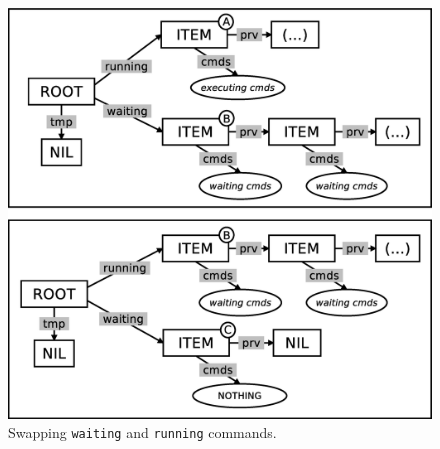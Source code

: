 \documentclass{sig-alternate}
\newcommand{\code}[1] {{\small{\texttt{#1}}}}
\begin{document}
\begin{figure}[t]
\centering
\includegraphics[scale=0.26]{queue-fig-1.eps}
\caption{
Swapping \code{waiting} and \code{running} commands.
\label{fig.queue-1}
}
\end{figure}
\end{document}
